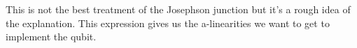 \documentclass[english, a4paper, 12pt, twoside]{article}
\numberwithin{equation}{section} %
\begin{document}
This is not the best treatment of the Josephson junction but it's a rough idea of the explanation. This expression gives us the a-linearities we want to get to implement the qubit.




\end{document}
